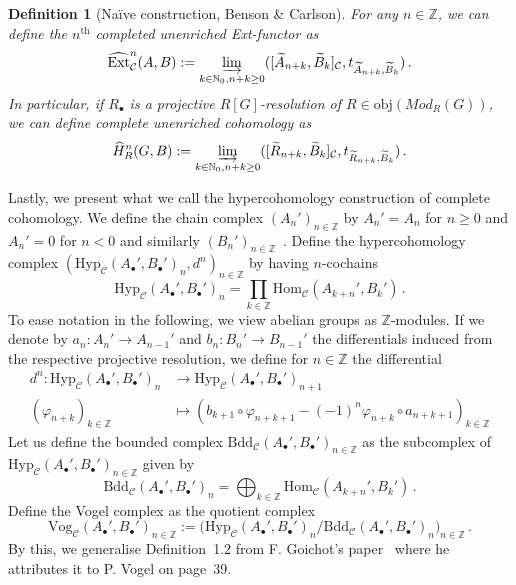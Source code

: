 \documentclass[12pt, a4paper]{article}
\numberwithin{equation}{section}
\newtheorem{defn}[thm]{Definition}
\theoremstyle{empty}
\theoremstyle{nonumberplain}
\begin{document}
\begin{defn}[Naïve construction, Benson \& Carlson]
For any $n \in \mathbb{Z}$, we can define the $n^{\text{th}}$ completed unenriched Ext-functor as
\[ \widehat{\mathrm{Ext}}_{\mathcal{C}}^n(A, B) := \varinjlim_{k \in \mathbb{N}_0, n+k \geq 0} ([\widetilde{A}_{n+k}, \widetilde{B}_k]_{\mathcal{C}}, t_{\widetilde{A}_{n+k}, \widetilde{B}_k}) \, . \]
In particular, if $R_{\bullet}$ is a projective $R[G]$-resolution of $R \in \mathrm{obj}(Mod_R(G))$, we can define complete unenriched cohomology as
\[ \widehat{H}_R^n(G, B) := \varinjlim_{k \in \mathbb{N}_0, n+k \geq 0} ([\widetilde{R}_{n+k}, \widetilde{B}_k]_{\mathcal{C}}, t_{\widetilde{R}_{n+k}, \widetilde{B}_k}) \, . \]
\end{defn}

Lastly, we present what we call the hypercohomology construction of complete cohomology. We define the chain complex $(A_n')_{n \in \mathbb{Z}}$ by $A_n' = A_n$ for $n \geq 0$ and $A_n' = 0$ for $n < 0$ and similarly $(B_n')_{n \in \mathbb{Z}}$~\cite[p.~209]{kro95}. Define the hypercohomology complex $(\mathrm{Hyp}_{\mathcal{C}}(A_{\bullet}', B_{\bullet}')_n, d^n)_{n \in \mathbb{Z}}$ by having $n$-cochains 
\[ \mathrm{Hyp}_{\mathcal{C}}(A_{\bullet}', B_{\bullet}')_n = \prod_{k \in \mathbb{Z}} \mathrm{Hom}_{\mathcal{C}}(A_{k+n}', B_k') \, . \]
To ease notation in the following, we view abelian groups as $\mathbb{Z}$-modules. If we denote by $a_n: A_n' \rightarrow A_{n-1}'$ and $b_n: B_n' \rightarrow B_{n-1}'$ the differentials induced from the respective projective resolution, we define for $n \in \mathbb{Z}$ the differential
\begin{align}
d^n: \mathrm{Hyp}_{\mathcal{C}}(A_{\bullet}', B_{\bullet}')_n &\rightarrow \mathrm{Hyp}_{\mathcal{C}}(A_{\bullet}', B_{\bullet}')_{n+1} \label{eq:hypercohombd} \\ (\varphi_{n+k})_{k \in \mathbb{Z}} &\mapsto (b_{k+1} \circ \varphi_{n+k+1} - (-1)^n \varphi_{n+k} \circ a_{n+k+1})_{k \in \mathbb{Z}} \nonumber
\end{align}
Let us define the bounded complex $\mathrm{Bdd}_{\mathcal{C}}(A_{\bullet}', B_{\bullet}')_{n \in \mathbb{Z}}$ as the subcomplex of $\mathrm{Hyp}_{\mathcal{C}}(A_{\bullet}', B_{\bullet}')_{n \in \mathbb{Z}}$ given by
\[ \mathrm{Bdd}_{\mathcal{C}}(A_{\bullet}', B_{\bullet}')_n = \bigoplus_{k \in \mathbb{Z}} \mathrm{Hom}_{\mathcal{C}}(A_{k+n}', B_k') \, . \]
Define the Vogel complex as the quotient complex~\cite[p.~209]{kro95}
\[ \mathrm{Vog}_{\mathcal{C}}(A_{\bullet}', B_{\bullet}')_{n \in \mathbb{Z}} := \Big(\mathrm{Hyp}_{\mathcal{C}}(A_{\bullet}', B_{\bullet}')_n / \mathrm{Bdd}_{\mathcal{C}}(A_{\bullet}', B_{\bullet}')_n \Big)_{n \in \mathbb{Z}} \, . \]
By this, we generalise Definition~1.2 from F.\! Goichot's paper~\cite{goi92} where he attributes it to P.\! Vogel on page~39.
\end{document}
